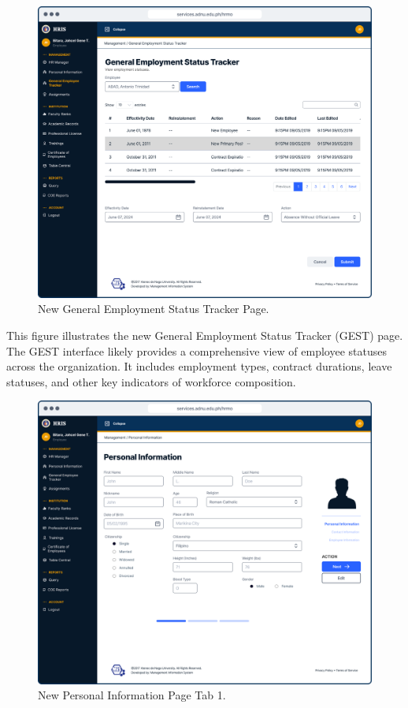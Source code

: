     \begin{figure}[H]
        \centering
        \includegraphics[width=1\linewidth]{figures/app/gest.png}
        \caption{New General Employment Status Tracker Page.}
        \label{fig:enter-label}
    \end{figure}

    This figure illustrates the new General Employment Status Tracker (GEST) page. The GEST interface likely provides a comprehensive view of employee statuses across the organization. It includes employment types, contract durations, leave statuses, and other key indicators of workforce composition. 

    \begin{figure}[H]
        \centering
        \includegraphics[width=1\linewidth]{figures/app/pi-1.png}
        \caption{New Personal Information Page Tab 1.}
        \label{fig:enter-label}
    \end{figure}

